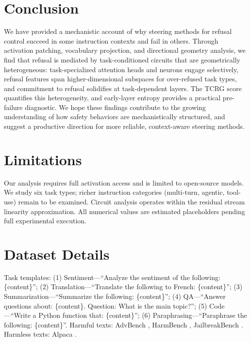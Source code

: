 \documentclass[11pt]{article}
\newcommand{\tcrg}{\textsc{TCRG}}
\begin{document}
\section{Conclusion}

We have provided a mechanistic account of why steering methods for refusal control succeed in some instruction contexts and fail in others. Through activation patching, vocabulary projection, and directional geometry analysis, we find that refusal is mediated by task-conditioned circuits that are geometrically heterogeneous: task-specialized attention heads and neurons engage selectively, refusal features span higher-dimensional subspaces for over-refused task types, and commitment to refusal solidifies at task-dependent layers. The \tcrg{} score quantifies this heterogeneity, and early-layer entropy provides a practical pre-failure diagnostic. We hope these findings contribute to the growing understanding of how safety behaviors are mechanistically structured, and suggest a productive direction for more reliable, context-aware steering methods.

\section*{Limitations}

Our analysis requires full activation access and is limited to open-source models. We study six task types; richer instruction categories (multi-turn, agentic, tool-use) remain to be examined. Circuit analysis operates within the residual stream linearity approximation. All numerical values are estimated placeholders pending full experimental execution.



\appendix

\section{Dataset Details}
\label{sec:appendix_data}

Task templates: (1) Sentiment---``Analyze the sentiment of the following: \{content\}''; (2) Translation---``Translate the following to French: \{content\}''; (3) Summarization---``Summarize the following: \{content\}''; (4) QA---``Answer questions about: \{content\}. Question: What is the main topic?''; (5) Code---``Write a Python function that: \{content\}''; (6) Paraphrasing---``Paraphrase the following: \{content\}''. Harmful texts: AdvBench \citep{zou2023advbench}, HarmBench \citep{mazeika2024harmbench}, JailbreakBench \citep{chao2024jailbreakbench}. Harmless texts: Alpaca \citep{taori2023alpaca}.
\end{document}
